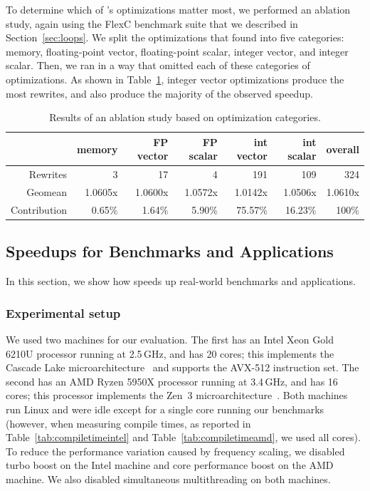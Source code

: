 To determine which of \minotaur's optimizations matter most, we performed
an ablation study, again using the FlexC benchmark suite that we
described in Section~\ref{sec:loops}.
%
We split the optimizations that \minotaur{} found into five
categories: memory, floating-point vector, floating-point scalar,
integer vector, and integer scalar.
%
Then, we ran \minotaur{} in a way that omitted each of these categories of
optimizations.
%
As shown in Table~\ref{tab:ablation}, integer vector optimizations
produce the most rewrites, and also produce the majority of the
observed speedup.

\begin{table}[tbp]
  \centering
  \caption{Results of an ablation study based on optimization categories.}
  \begin{tabular}{ r | r r r r r r}
    \toprule
    & memory & FP vector & FP scalar& int vector & int scalar & overall \\
    \hline
    Rewrites & 3 & 17 & 4 & 191 & 109 & 324 \\
    Geomean & 1.0605x & 1.0600x & 1.0572x & 1.0142x & 1.0506x & 1.0610x \\
    Contribution & 0.65\% & 1.64\% & 5.90\% & 75.57\% & 16.23\% & 100\% \\
    \bottomrule
  \end{tabular}
  \label{tab:ablation}
\end{table}

\subsection{Speedups for Benchmarks and Applications}

In this section, we show how \minotaur{} speeds up real-world benchmarks
and applications.

\subsubsection{Experimental setup}
%
We used two machines for our evaluation.
%
The first has an Intel Xeon Gold 6210U processor running at 2.5\,GHz,
and has 20 cores; this implements the Cascade Lake
microarchitecture~\cite{cascadelake} and supports the AVX-512
instruction set.
%
The second has an AMD Ryzen 5950X processor running at 3.4\,GHz, and
has 16 cores; this processor implements the Zen~3
microarchitecture~\cite{zen3}.
%
Both machines run Linux and were idle except for a single core running
our benchmarks (however, when measuring compile times, as reported in
Table~\ref{tab:compiletimeintel} and Table~\ref{tab:compiletimeamd}, we used all cores).
%
To reduce the performance variation caused by frequency scaling, we
disabled turbo boost on the Intel machine and core performance
boost on the AMD machine.
%
We also disabled simultaneous multithreading on both machines.


